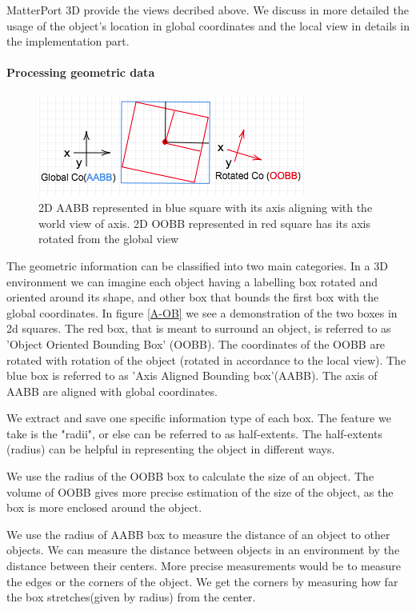 MatterPort 3D provide the views decribed above. We discuss in more detailed the usage of the object's location in global coordinates and the local view in details in the implementation part.  

\paragraph{Processing geometric data}

\begin{figure}[H]
\centering
\includegraphics[scale=0.5]{images/A-OB.png}
\caption{2D AABB represented in blue square with its axis aligning with the world view of axis. 2D OOBB represented in red square has its axis rotated from the global view }
\label{fig:A-OB}
\end{figure}


The geometric information can be classified into two main categories. In a 3D environment we can imagine each object having  a labelling box rotated and oriented around its shape, and other box that bounds the first box with the global coordinates. In figure \ref{A-OB} we see a demonstration of the two boxes in 2d squares. The red box, that is meant to surround an object, is referred to as 'Object Oriented Bounding Box' (OOBB). The coordinates of the OOBB are rotated with rotation of the object (rotated in accordance to the local view). The blue box is referred to as 'Axis Aligned Bounding box'(AABB). The axis of AABB are aligned with global coordinates. 

We extract and save one specific information type of each box. The feature we take is the "radii", or else can be referred to as half-extents. The half-extents (radius) can be helpful in representing the object in different ways.  

We use the radius of the OOBB box to calculate the size of an object. The volume of OOBB gives more precise estimation of the size of the object, as the box is more enclosed around the object.

We use the radius of AABB box to measure the distance of an object to other objects. We can measure the distance between objects in an environment by the distance between their centers. More precise measurements would be to measure the edges or the corners of the object. We get the corners by measuring how far the box stretches(given by radius) from the center.  

